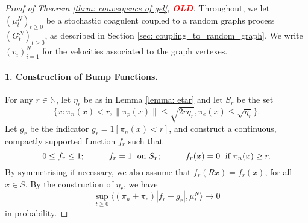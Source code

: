  
   \begin{proof}[Proof of Theorem \ref{thrm: convergence of gel}, \textcolor{red}{\textbf{OLD}}] Throughout, we let $(\mu^N_t)_{t\geq 0}$ be a stochastic coagulent coupled to a random graphs process $(G^N_t)_{t\geq 0}$, as described in Section \ref{sec: coupling_to_random_graph}. We write $(v_i)_{i=1}^N$ for the velocities associated to the graph vertexes. \paragraph{1. Construction of Bump Functions.} For any $r \in \mathbb{N}$, let $\eta_r$ be as in Lemma \ref{lemma: etar} and let $S_r$ be the set \begin{equation}
       \{x: \pi_n(x)< r, \|\pi_p(x)\|\leq \sqrt{2r\eta_r}, \pi_e(x)\leq \sqrt{\eta_r}\}.
   \end{equation} Let $g_r$ be the indicator $g_r=1[\pi_n(x)< r]$, and construct a continuous, compactly supported function $f_r$ such that \begin{equation}
      0\leq f_r\leq 1;\hspace{1cm} f_r=1 \hspace{0.1cm} \text{ on } S_r;\hspace{1cm} f_r(x)=0 \hspace{0.1cm} \text{ if } \pi_n(x)\ge r.
   \end{equation} By symmetrising if necessary, we also assume that $f_r(Rx)=f_r(x)$, for all $x\in S$. By the construction of $\eta_r$, we have \begin{equation}
       \sup_{t\geq 0}\langle (\pi_n+\pi_e)|f_r-g_r|, \mu^N_t\rangle \rightarrow 0
   \end{equation} in probability. 

\end{proof}
